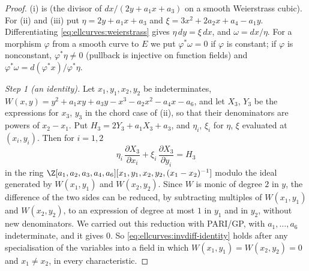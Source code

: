 \begin{proof}
(i) is  (the divisor of $dx/(2y+a_1x+a_3)$ on a smooth Weierstrass cubic). For (ii) and (iii) put $\eta=2y+a_1x+a_3$ and
$\xi=3x^2+2a_2x+a_4-a_1y$. Differentiating \eqref{eq:ellcurves:weierstrass} gives $\eta\,dy=\xi\,dx$, and $\omega=dx/\eta$. For a morphism $\varphi$ from a
smooth curve to $E$ we put $\varphi^*\omega=0$ if $\varphi$ is constant; if $\varphi$ is nonconstant, $\varphi^*\eta\ne0$ (pullback is injective on function fields) and
$\varphi^*\omega=d(\varphi^*x)/\varphi^*\eta$.

\emph{Step 1 (an identity).} Let $x_1,y_1,x_2,y_2$ be indeterminates, $W(x,y)=y^2+a_1xy+a_3y-x^3-a_2x^2-a_4x-a_6$, and let $X_3$, $Y_3$ be the
expressions for $x_3$, $y_3$ in the chord case of (ii), so that their denominators are powers of $x_2-x_1$. Put
$H_3=2Y_3+a_1X_3+a_3$, and $\eta_i$, $\xi_i$ for $\eta$, $\xi$ evaluated at $(x_i,y_i)$. Then for $i=1,2$
\begin{equation}\label{eq:ellcurves:invdiff-identity}
\eta_i\,\frac{\partial X_3}{\partial x_i}+\xi_i\,\frac{\partial X_3}{\partial y_i}=H_3
\end{equation}
in the ring $\Z[a_1,a_2,a_3,a_4,a_6][x_1,y_1,x_2,y_2,(x_1-x_2)^{-1}]$ modulo the ideal generated by $W(x_1,y_1)$ and $W(x_2,y_2)$. Since $W$ is monic of degree $2$
in $y$, the difference of the two sides can be reduced, by subtracting multiples of $W(x_1,y_1)$ and $W(x_2,y_2)$, to an expression of degree at most $1$ in $y_1$ and
in $y_2$, without new denominators. We carried out this reduction with PARI/GP, with $a_1,\dots,a_6$ indeterminate, and it gives $0$. So
\eqref{eq:ellcurves:invdiff-identity} holds after any specialisation of the variables into a field in which $W(x_1,y_1)=W(x_2,y_2)=0$ and $x_1\ne x_2$, in every
characteristic.


\end{proof}
